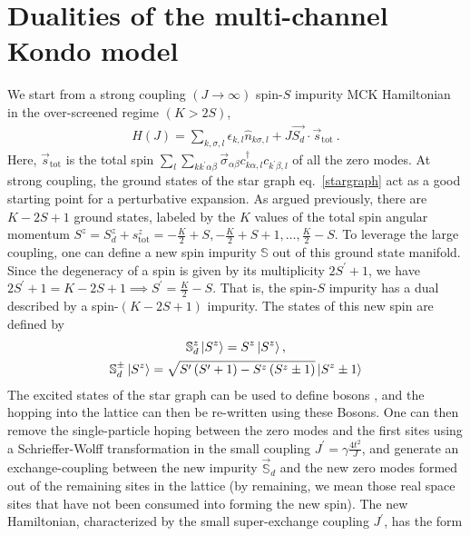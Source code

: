 \documentclass[reprint,prb,superscriptaddress]{revtex4-2}
\begin{document}
\section{Dualities of the multi-channel Kondo model}
We start from a strong coupling \((J \to \infty)\) spin-\(S\) impurity MCK Hamiltonian in the over-screened regime \(\left( K > 2S \right) \),
\begin{equation}\begin{aligned}
	\label{strong_ham}
	H(J) = \sum_{k,\sigma,l}\epsilon_{k,l} \hat n_{k\sigma,l} + J \vec{S_d}\cdot\vec{s}_\text{tot}~.
\end{aligned}\end{equation}
Here, \(\vec s_\text{tot}\) is the total spin \(\sum_l \sum_{kk^\prime \alpha\beta} \vec \sigma_{\alpha\beta}c^\dagger_{k\alpha,l}c_{k^\prime\beta,l}\) of all the zero modes. At strong coupling, the ground states of the star graph eq.~\ref{stargraph} act as a good starting point for a perturbative expansion. As argued previously, there are \(K-2S+1\) ground states, labeled by the \(K\) values of the total spin angular momentum \(S^z = S_d^z + s_\text{tot}^z = -\frac{K}{2} + S, -\frac{K}{2} + S + 1, \ldots, \frac{K}{2} - S\). To leverage the large coupling, one can define a new spin impurity \(\mathbb{S}\) out of this ground state manifold. Since the degeneracy of a spin is given by its multiplicity \(2S^\prime + 1\), we have \(2S^\prime + 1 = K-2S+1 \implies S^\prime = \frac{K}{2} - S\). That is, the spin-\(S\) impurity has a dual described by a spin-\((K-2S+1)\) impurity. The states of this new spin are defined by
\begin{gather}
	\mathbb{S}_d^z \ket{S^z} = S^z \ket{S^z},\nonumber\\
	\mathbb{S}_d^\pm \ket{S^z} = \sqrt{S^\prime\left( S^\prime + 1 \right) - S^z\left( S^z \pm 1\right)} \ket{S^z \pm 1}
\end{gather}
The excited states of the star graph can be used to define bosons \cite{kroha_kolf_2007}, and the hopping into the lattice can then be re-written using these Bosons. One can then remove the single-particle hoping between the zero modes and the first sites using a Schrieffer-Wolff transformation in the small coupling \(J^\prime = \gamma \frac{4t^2}{J}\), and generate an exchange-coupling between the new impurity \(\vec {\mathbb{S}}_d\) and the new zero modes formed out of the remaining sites in the lattice \cite{kroha_kolf_2007} (by remaining, we mean those real space sites that have not been consumed into forming the new spin). The new Hamiltonian, characterized by the small super-exchange  coupling \(J^\prime\), has the form
\end{document}
